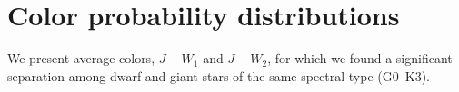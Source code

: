 \chapter{Color probability distributions}\label{Appendix:3}
We present average colors, $J-W_{1}$ and $J-W_{2}$, for which we found a significant separation among dwarf and giant stars of the same spectral type (G0--K3). 
